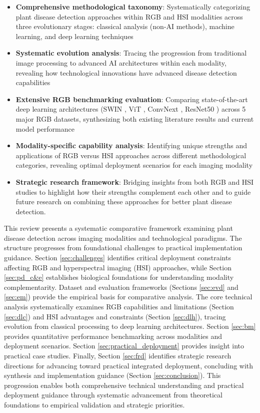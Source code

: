 \documentclass[sn-mathphys]{sn-jnl}
\theoremstyle{thmstyleone}%
\theoremstyle{thmstyletwo}%
\theoremstyle{thmstylethree}%
\begin{document}
\begin{itemize}
    \item [--] \textbf{Comprehensive methodological taxonomy}: Systematically categorizing plant disease detection approaches within RGB and HSI modalities across three evolutionary stages: classical analysis (non-AI methods), machine learning, and deep learning techniques
    
    \item [--] \textbf{Systematic evolution analysis}: Tracing the progression from traditional image processing to advanced AI architectures within each modality, revealing how technological innovations have advanced disease detection capabilities
    
    \item [--] \textbf{Extensive RGB benchmarking evaluation}: Comparing state-of-the-art deep learning architectures (SWIN \citep{liu2021swin}, ViT \citep{dosovitskiy2020image}, ConvNext \citep{liu2022convnet}, ResNet50 \citep{he2016deep}) across 5 major RGB datasets, synthesizing both existing literature results and current model performance
    
    \item [--] \textbf{Modality-specific capability analysis}: Identifying unique strengths and applications of RGB versus HSI approaches across different methodological categories, revealing optimal deployment scenarios for each imaging modality
    
    \item [--] \textbf{Strategic research framework}: Bridging insights from both RGB and HSI studies to highlight how their strengths complement each other and to guide future research on combining these approaches for better plant disease detection.
\end{itemize}
This review presents a systematic comparative framework examining plant disease detection across imaging modalities and technological paradigms. The structure progresses from foundational challenges to practical implementation guidance. Section \ref{sec:challenges} identifies critical deployment constraints affecting RGB and hyperspectral imaging (HSI) approaches, while Section \ref{sec:pd_c&e} establishes biological foundations for understanding modality complementarity. Dataset and evaluation frameworks (Sections \ref{sec:evd} and \ref{sec:em}) provide the empirical basis for comparative analysis. The core technical analysis systematically examines RGB capabilities and limitations (Section \ref{sec:dlc}) and HSI advantages and constraints (Section \ref{sec:dlh}), tracing evolution from classical processing to deep learning architectures. Section \ref{sec:bm} provides quantitative performance benchmarking across modalities and deployment scenarios. Section \ref{sec:practical_deployment} provides insight into practical case studies. Finally, Section \ref{sec:frd} identifies strategic research directions for advancing toward practical integrated deployment, concluding with synthesis and implementation guidance (Section \ref{sec:conclusion}). This progression enables both comprehensive technical understanding and practical deployment guidance through systematic advancement from theoretical foundations to empirical validation and strategic priorities.
\end{document}
